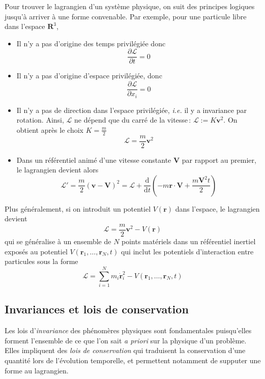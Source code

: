         Pour trouver le lagrangien d’un système physique, on suit des principes logiques jusqu’à arriver à une forme convenable. Par exemple, pour une particule libre dans l’espace $\mathbf{R}^3$, 
        \begin{itemize}
            \item Il n’y a pas d’origine des temps privilégiée donc 
            \[ \frac{\partial \mathcal{L}}{\partial t} = 0 \]   
            \item Il n’y a pas d’origine d’espace privilégiée, donc 
            \[ \frac{\partial \mathcal{L}}{\partial x_i} = 0 \]   
            \item Il n’y a pas de direction dans l’espace privilégiée, \textit{i.e.} il y a invariance par rotation. Ainsi, $\mathcal{L}$ ne dépend que du carré de la vitesse : $\mathcal{L} := K \mathbf{v}^2$. On obtient après le choix $K = \frac{m}{2}$ 
            \[ \mathcal{L} = \frac{m}{2} \mathbf{v}^2 \]
            \item Dans un référentiel animé d’une vitesse constante $\mathbf{V}$ par rapport au premier, le lagrangien devient alors 
            \[ \mathcal{L}' = \frac{m}{2} (\mathbf{v} - \mathbf{V})^2 = \mathcal{L} + \frac{\text{d}}{\text{d}t} (-m \mathbf{r} \cdot \mathbf{V} + \frac{m \mathbf{V}^2 t}{2}) \] 
        \end{itemize}
        Plus généralement, si on introduit un potentiel $V(\mathbf{r})$ dans l’espace, le lagrangien devient 
        \[ \mathcal{L} = \frac{m}{2} \mathbf{v}^2 - V(\mathbf{r}) \]   
        qui se généralise à un ensemble de $N$ points matériels dans un référentiel inertiel exposés au potentiel $V(\mathbf{r}_1, \ldots, \mathbf{r}_N, t)$ qui inclut les potentiels d’interaction entre particules sous la forme 
        \[ \mathcal{L} = \sum_{i =1}^N m_i \dot{\mathbf{r}}_i^2 - V(\mathbf{r}_1, \ldots, \mathbf{r}_N, t) \]    

    \subsection{Invariances et lois de conservation}

    Les lois d’\textit{invariance} des phénomères physiques sont fondamentales puisqu’elles forment l’ensemble de ce que l’on sait \textit{a priori} sur la physique d’un problème. Elles impliquent des \textit{lois de conservation} qui traduisent la conservation d’une quantité lors de l’évolution temporelle, et permettent notamment de supputer une forme au lagrangien.
        
